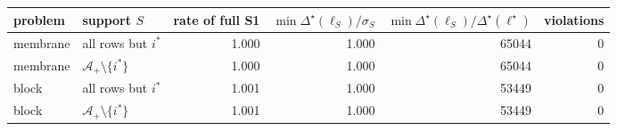 \begin{tabular}{llrrrr}
\hline
problem & support $S$ & rate of full S1 & $\min\Delta^\star(\ell_S)/\sigma_S$ & $\min\Delta^\star(\ell_S)/\Delta^\star(\ell^\star)$ & violations \\
\hline
membrane & all rows but $i^\ast$ & 1.000 & 1.000 & 65044 & 0 \\
membrane & $\mathcal A_+\setminus\{i^\ast\}$ & 1.000 & 1.000 & 65044 & 0 \\
block & all rows but $i^\ast$ & 1.001 & 1.000 & 53449 & 0 \\
block & $\mathcal A_+\setminus\{i^\ast\}$ & 1.001 & 1.000 & 53449 & 0 \\
\hline
\end{tabular}
